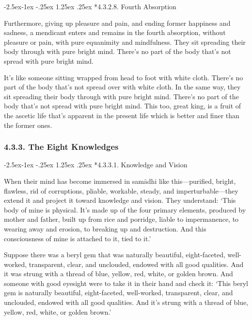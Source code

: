 \documentclass[12pt,openany]{book}%
\makeatletter
\renewcommand\paragraph{\@startsection{paragraph}{4}{\z@}%
            {-2.5ex\@plus -1ex \@minus -.25ex}%
            {1.25ex \@plus .25ex}%
            {\noindent\Semiboldnormalfont\normalsize}}
\makeatother
\begin{document}
\paragraph*{4.3.2.8. Fourth Absorption }

Furthermore, giving up pleasure and pain, and ending former happiness and sadness, a mendicant enters and remains in the fourth absorption, without pleasure or pain, with pure equanimity and mindfulness. They sit spreading their body through with pure bright mind. There’s no part of the body that’s not spread with pure bright mind. 

It’s like someone sitting wrapped from head to foot with white cloth. There’s no part of the body that’s not spread over with white cloth. In the same way, they sit spreading their body through with pure bright mind. There’s no part of the body that’s not spread with pure bright mind. This too, great king, is a fruit of the ascetic life that’s apparent in the present life which is better and finer than the former ones. 

\subsubsection*{4.3.3. The Eight Knowledges }

\paragraph*{4.3.3.1. Knowledge and Vision }

When their mind has become immersed in \textsanskrit{samādhi} like this—purified, bright, flawless, rid of corruptions, pliable, workable, steady, and imperturbable—they extend it and project it toward knowledge and vision. They understand: ‘This body of mine is physical. It’s made up of the four primary elements, produced by mother and father, built up from rice and porridge, liable to impermanence, to wearing away and erosion, to breaking up and destruction. And this consciousness of mine is attached to it, tied to it.’ 

Suppose there was a beryl gem that was naturally beautiful, eight-faceted, well-worked, transparent, clear, and unclouded, endowed with all good qualities. And it was strung with a thread of blue, yellow, red, white, or golden brown. And someone with good eyesight were to take it in their hand and check it: ‘This beryl gem is naturally beautiful, eight-faceted, well-worked, transparent, clear, and unclouded, endowed with all good qualities. And it’s strung with a thread of blue, yellow, red, white, or golden brown.’ 
\end{document}
